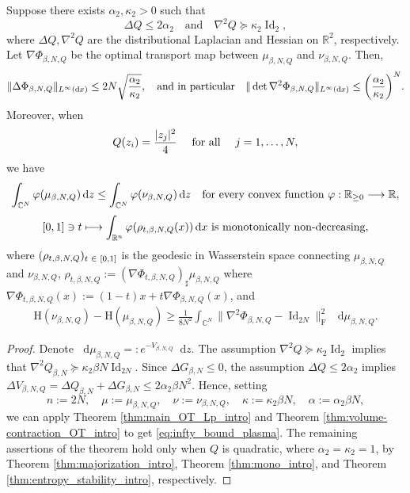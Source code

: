 \documentclass[AHL,Unicode,longabstracts]{cedram}
\newcommand{\R}{\mathbb R}
\newcommand{\C}{\mathbb C}
\DeclareMathOperator{\Id}{Id}
\newcommand{\Ent}{\mathrm H}
\newcommand{\V}{V}
\newcommand{\dd}{n}
\newcommand{\prob}{\rho}
\newcommand{\source}{\mu}
\newcommand{\target}{\nu}
\newcommand{\lsh}{\alpha}
\newcommand{\lc}{\kappa}
\newcommand*\diff{\mathop{}\!\mathrm{d}}
\newcommand{\OT}{\Phi}
\newcommand{\cxfun}{\varphi}
\renewcommand*{\to}{\mathchoice{\longrightarrow}{\rightarrow}{\rightarrow}{\rightarrow}}
\let\oldmapsto\mapsto
\renewcommand*{\mapsto}{\mathchoice{\longmapsto}{\oldmapsto}{\oldmapsto}{\oldmapsto}}
\let\originalleft\left
\let\originalright\right
\renewcommand{\left}{\mathopen{}\mathclose\bgroup\originalleft}
\renewcommand{\right}{\aftergroup\egroup\originalright}
\let\oldin\in
\renewcommand{\in}{\mathchoice{\oldin}{\oldin}{\,\oldin\,}{\,\oldin\,}}
\begin{document}
\begin{theo}\label{thm:Coulomb}
Suppose there exists $\lsh_2,\lc_2>0$ such that 
\[
\Delta Q \le 2\lsh_2\quad\text{and}\quad \nabla^2Q \succeq \lc_2 \Id_{2},
\]
where $\Delta Q, \nabla^2Q$ are the distributional Laplacian and Hessian on $\R^2$, respectively. Let $\nabla\OT_{\beta,N,Q}$ be the optimal transport map between $\source_{\beta,N,Q}$ and $\target_{\beta,N,Q}$. Then, 
\begin{align}
\label{eq:infty_bound_plasma}
\|\Delta\OT_{\beta,N,Q}\|_{L^{\infty}(\diff x)}\le 2N\sqrt{\frac{\lsh_2}{\lc_2}} ,\quad\text{and in particular}\quad  \|\det\nabla^2\OT_{\beta,N,Q}\|_{L^{\infty}(\diff x)}\le \left(\frac{\lsh_2}{\lc_2}\right)^N.
\end{align}
Moreover, when 
\begin{equation}
\label{eq:quad_coulomb}
Q(z_i)=\frac{|z_j|^2}{4}\quad\textnormal{ for all }\quad j=1,\ldots, N,
\end{equation}
we have
\begin{align}
\label{eq:majorization_plasma}
\int_{\C^N} \cxfun(\source_{\beta,N,Q})\diff z\le \int_{\C^N} \cxfun(\target_{\beta,N,Q})\diff z\quad\text{for every convex function }\mathrm \cxfun:\R_{\ge 0} \to \R,
\end{align}
\begin{equation}
\label{eq:mono_geo_plasma}
[0,1]\ni t\mapsto \int_{\R^{\dd}}\cxfun(\prob_{t,\beta,N,Q}(x))\diff x\textnormal{ is monotonically non-decreasing},
\end{equation}
where  $(\prob_{t,\beta,N,Q})_{t\in [0,1]}$ is the geodesic in Wasserstein space connecting $\source_{\beta,N,Q}$ and $\target_{\beta,N,Q}$, $\prob_{t,\beta,N,Q}:=(\nabla\OT_{t,\beta,N,Q})_{\sharp}\source_{\beta,N,Q}$ where $\nabla\OT_{t,\beta,N,Q}(x):=(1-t)x+t\nabla\OT_{\beta,N,Q}(x)$, and
\begin{align}
\label{eq:entropy_stability_plasma}
\Ent(\target_{\beta,N,Q})- \Ent(\source_{\beta,N,Q}) \ge   \frac{1}{8N^2}\int_{\C^N}\|\nabla^2\OT_{\beta,N,Q}-\Id_{2N}\|_{\text{F}}^2\,\diff \source_{\beta,N,Q}.
\end{align}
\end{theo}
\begin{proof}
Denote $\diff\source_{\beta,N,Q}=:e^{-\V_{\beta,N,Q}}\diff z$. The assumption $\nabla^2Q  \succeq \lc_2 \Id_{2}$ implies that $\nabla^2Q_{\beta,N}  \succeq \lc_2 \beta N\Id_{2N}$. Since $\Delta  G_{\beta,N}\le 0$, the assumption $\Delta Q \le 2\lsh_2$ implies $\Delta \V_{\beta,N,Q}=\Delta Q_{\beta,N}+\Delta  G_{\beta,N}\le 2\lsh_2\beta N^2$.  Hence, setting 
\[
\dd:=2N,\quad \source:=\source_{\beta,N,Q},\quad\target:=\target_{\beta,N,Q},\quad \lc:=\lc_2\beta N,\quad \lsh:=\lsh_2\beta N,
\]
we can apply Theorem \ref{thm:main_OT_Lp_intro}  and Theorem \ref{thm:volume-contraction_OT_intro} to get \eqref{eq:infty_bound_plasma}. The remaining assertions of the theorem hold only when $Q$ is quadratic,  where $\lsh_2=\lc_2=1$, by Theorem \ref{thm:majorization_intro}, Theorem \ref{thm:mono_intro}, and Theorem \ref{thm:entropy_stability_intro}, respectively.
\end{proof}
\end{document}

